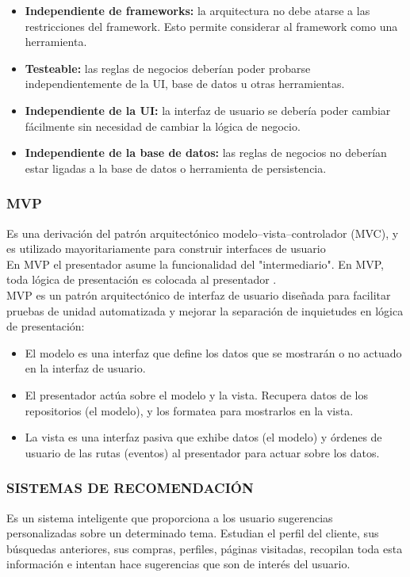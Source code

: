 \begin{itemize}
\item \textbf{Independiente de frameworks:} la arquitectura no debe atarse a las restricciones del framework. Esto permite considerar al framework como una herramienta.
\item \textbf{Testeable:} las reglas de negocios deberían poder probarse independientemente de la UI, base de datos u otras herramientas.
\item \textbf{Independiente de la UI:} la interfaz de usuario se debería poder cambiar fácilmente sin necesidad de cambiar la lógica de negocio.
\item \textbf{Independiente de la base de datos:} las reglas de negocios no deberían estar ligadas a la base de datos o herramienta de persistencia.
\end{itemize}

\subsubsection{\textbf{MVP}}
Es una derivación del patrón arquitectónico modelo–vista–controlador (MVC), y es utilizado mayoritariamente para construir interfaces de usuario\\
En MVP el presentador asume la funcionalidad del "intermediario". En MVP, toda lógica de presentación es colocada al presentador .\\
MVP es un patrón arquitectónico de interfaz de usuario diseñada para facilitar pruebas de unidad automatizada y mejorar la separación de inquietudes en lógica de presentación:
\begin{itemize}
\item El modelo es una interfaz que define los datos que se mostrarán o no actuado en la interfaz de usuario.
\item El presentador actúa sobre el modelo y la vista. Recupera datos de los repositorios (el modelo), y los formatea para mostrarlos en la vista.
\item La vista es una interfaz pasiva que exhibe datos (el modelo) y órdenes de usuario de las rutas (eventos) al presentador para actuar sobre los datos.
\end{itemize}

\subsubsection{\textbf{SISTEMAS DE RECOMENDACIÓN}}

Es un sistema inteligente que proporciona a los usuario sugerencias personalizadas sobre un determinado tema. Estudian el perfil del cliente, sus búsquedas anteriores, sus compras, perfiles, páginas visitadas, recopilan toda esta información e intentan hace sugerencias que son de interés del usuario.\\

